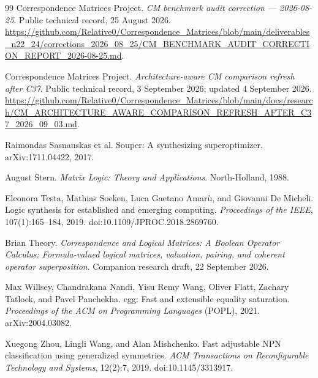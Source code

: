 \documentclass[10pt]{article}
\theoremstyle{plain}
\theoremstyle{definition}
\theoremstyle{remark}
\begin{document}
\begin{thebibliography}{99}
Correspondence Matrices Project.
\newblock \emph{CM benchmark audit correction --- 2026-08-25}.
\newblock Public technical record, 25 August 2026.
\newblock \url{https://github.com/Relative0/Correspondence_Matrices/blob/main/deliverables_n22_24/corrections_2026_08_25/CM_BENCHMARK_AUDIT_CORRECTION_REPORT_2026-08-25.md}.

Correspondence Matrices Project.
\newblock \emph{Architecture-aware CM comparison refresh after C37}.
\newblock Public technical record, 3 September 2026; updated 4 September 2026.
\newblock \url{https://github.com/Relative0/Correspondence_Matrices/blob/main/docs/research/CM_ARCHITECTURE_AWARE_COMPARISON_REFRESH_AFTER_C37_2026_09_03.md}.

Raimondas Sasnauskas et al.
\newblock Souper: A synthesizing superoptimizer.
\newblock arXiv:1711.04422, 2017.

August Stern.
\newblock \emph{Matrix Logic: Theory and Applications}.
\newblock North-Holland, 1988.

Eleonora Testa, Mathias Soeken, Luca Gaetano Amar\`u, and Giovanni De Micheli.
\newblock Logic synthesis for established and emerging computing.
\newblock \emph{Proceedings of the IEEE}, 107(1):165--184, 2019.
\newblock doi:10.1109/JPROC.2018.2869760.

Brian Theory.
\newblock \emph{Correspondence and Logical Matrices: A Boolean Operator Calculus: Formula-valued logical matrices, valuation, pairing, and coherent operator superposition}.
\newblock Companion research draft, 22 September 2026.

Max Willsey, Chandrakana Nandi, Yisu Remy Wang, Oliver Flatt, Zachary Tatlock, and Pavel Panchekha.
\newblock egg: Fast and extensible equality saturation.
\newblock \emph{Proceedings of the ACM on Programming Languages} (POPL), 2021.
\newblock arXiv:2004.03082.

Xuegong Zhou, Lingli Wang, and Alan Mishchenko.
\newblock Fast adjustable NPN classification using generalized symmetries.
\newblock \emph{ACM Transactions on Reconfigurable Technology and Systems}, 12(2):7, 2019.
\newblock doi:10.1145/3313917.

\end{thebibliography}
\end{document}
